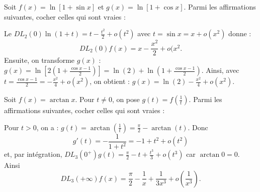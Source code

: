 \begin{question}
Soit $\displaystyle f(x)=\ln \left[1+\sin x\right]$ et $\displaystyle g(x)=\ln \left[1+\cos x\right]$. Parmi les affirmations suivantes, cocher celles qui sont vraies :
\begin{answers}  
\end{answers}
\vskip2mm
\begin{explanations}
Le $\displaystyle DL_2(0)\ln (1+t)=t-\frac{t^2}{2}+o(t^2)$ avec $\displaystyle t=\sin x=x+o(x^2)$ donne :
$$DL_2(0)f(x)=x-\frac{x^2}{2}+o(x^2.$$
Ensuite, on transforme $g(x)$ : $\displaystyle g(x)=\ln \left[2\left(1+\frac{\cos x-1}{2}\right)\right]=\ln (2)+\ln \left(1+\frac{\cos x-1}{2}\right)$. Ainsi, avec $\displaystyle t=\frac{\cos x-1}{2}=-\frac{x^2}{4}+o(x^2)$, on obtient : $\displaystyle g(x)=\ln (2)-\frac{x^2}{4}+o(x^2)$.
\end{explanations}
\end{question}

\begin{question}
Soit $\displaystyle f(x)=\arctan x$. Pour $t\neq 0$, on pose $\displaystyle g(t)=f\left(\frac{1}{t}\right)$. Parmi les affirmations suivantes, cocher celles qui sont vraies :
\begin{answers}  
\end{answers}

\vskip2mm

\begin{explanations}
Pour $t>0$, on a : $\displaystyle g(t)=\arctan \left(\frac{1}{t}\right)=\frac{\pi}{2}-\arctan (t)$. Donc
$$\displaystyle g'(t)=-\frac{1}{1+t^2}=-1+t^2+o(t^2)$$
et, par intégration, $\displaystyle DL_3(0^+)g(t)=\frac{\pi}{2}-t+\frac{t^3}{3}+o(t^3)$ car $\arctan 0=0$. Ainsi
$$\displaystyle DL_3(+\infty)f(x)=\frac{\pi}{2}-\frac{1}{x}+\frac{1}{3x^3}+o\left(\frac{1}{x^3}\right).$$
\end{explanations}
\end{question}


